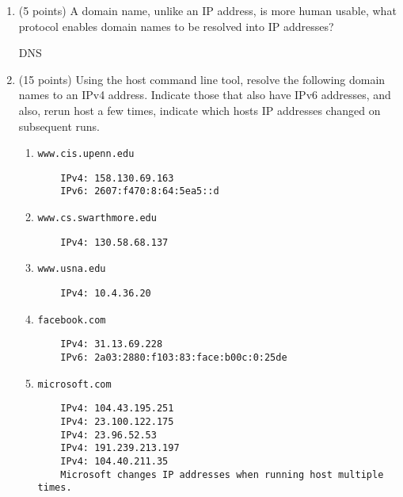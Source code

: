 \documentclass{article}[9pt]
\newenvironment{answerfont}{\fontfamily{qhv}\selectfont}{\par}
\newenvironment{myanswer}{\begin{mdframed}\begin{answerfont}}{\end{answerfont}\end{mdframed}}
\begin{document}
\begin{enumerate}
\item (5 points) A domain name, unlike an IP address, is more human usable, what protocol enables domain names to be resolved into IP addresses?

    \begin{myanswer}
    DNS
    \end{myanswer}


\item (15 points) Using the host command line tool, resolve the following domain names to an IPv4 address. Indicate those that also have IPv6 addresses, and also, rerun host a few times,
 indicate which hosts IP addresses changed on subsequent runs.

  \begin{enumerate}
  \item \texttt{www.cis.upenn.edu}
    \begin{myanswer}
    \begin{verbatim}
    IPv4: 158.130.69.163
    IPv6: 2607:f470:8:64:5ea5::d
    \end{verbatim}
    \end{myanswer}

  \item \texttt{www.cs.swarthmore.edu}
    \begin{myanswer}
    \begin{verbatim}
    IPv4: 130.58.68.137
    \end{verbatim}
    \end{myanswer}

  \item \texttt{www.usna.edu}
    \begin{myanswer}
    \begin{verbatim}
    IPv4: 10.4.36.20
    \end{verbatim}
    \end{myanswer}

  \item \texttt{facebook.com}
    \begin{myanswer}
    \begin{verbatim}
    IPv4: 31.13.69.228
    IPv6: 2a03:2880:f103:83:face:b00c:0:25de
    \end{verbatim}
    \end{myanswer}

  \item \texttt{microsoft.com}
    \begin{myanswer}
    \begin{verbatim}
    IPv4: 104.43.195.251
    IPv4: 23.100.122.175
    IPv4: 23.96.52.53
    IPv4: 191.239.213.197
    IPv4: 104.40.211.35
    Microsoft changes IP addresses when running host multiple times.
    \end{verbatim}
    \end{myanswer}


\end{enumerate}
\end{enumerate}
\end{document}
